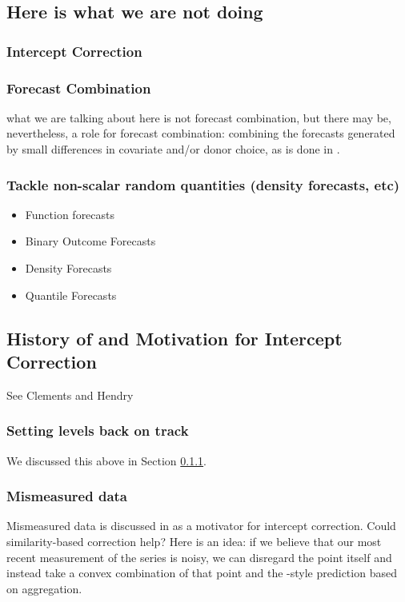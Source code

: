 \documentclass[11pt]{article}
\theoremstyle{definition}
\begin{document}
\subsection{Here is what we are not doing}

\subsubsection{Intercept Correction}\label{intercept_correction}
\subsubsection{Forecast Combination}
what we are talking about here is not forecast combination, but there may be, nevertheless, a role for forecast combination: combining the forecasts generated by small differences in covariate and/or donor choice, as is done in \cite{lundquist2024volatility}. \\

\subsubsection{Tackle non-scalar random quantities (density forecasts, etc)} 

\begin{itemize}
  \item Function forecasts
  \item Binary Outcome Forecasts
  \item Density Forecasts
  \item Quantile Forecasts
\end{itemize}
\subsection{History of and Motivation for Intercept Correction}
See Clements and Hendry
\subsubsection{Setting levels back on track}

We discussed this above in Section \ref{intercept_correction}.

\subsubsection{Mismeasured data}

Mismeasured data is discussed in \cite[p. 166]{hendry1994theory} as a motivator for intercept correction.  Could similarity-based correction help?  Here is an idea: if we believe that our most recent measurement of the series is noisy, we can disregard the point itself and instead take a convex combination of that point and the \cite{lin2021minimizing}-style prediction based on aggregation.
\end{document}

